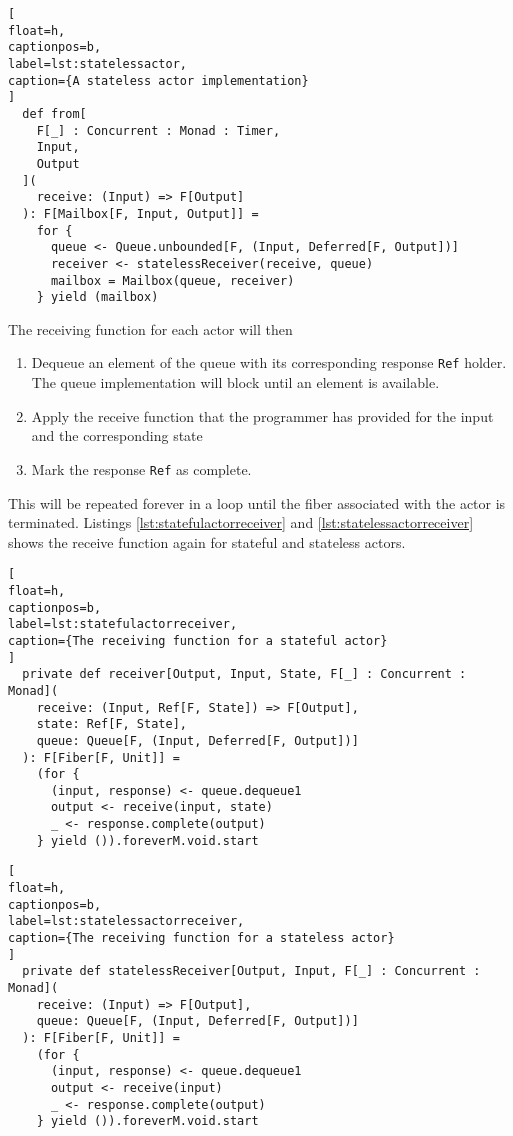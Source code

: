 \documentclass[../main.tex]{subfiles}
\begin{document}
\begin{lstlisting}[
float=h,
captionpos=b,
label=lst:statelessactor,
caption={A stateless actor implementation}
]
  def from[
    F[_] : Concurrent : Monad : Timer,
    Input,
    Output
  ](
    receive: (Input) => F[Output]
  ): F[Mailbox[F, Input, Output]] =
    for {
      queue <- Queue.unbounded[F, (Input, Deferred[F, Output])]
      receiver <- statelessReceiver(receive, queue)
      mailbox = Mailbox(queue, receiver)
    } yield (mailbox)
\end{lstlisting}

The receiving function for each actor will then

\begin{enumerate}
\item Dequeue an element of the queue with its corresponding response
  \texttt{Ref} holder. The queue implementation will block until an element is
  available.
\item Apply the receive function that the programmer has provided for the input
  and the corresponding state
\item Mark the response \texttt{Ref} as complete.
\end{enumerate}

This will be repeated forever in a loop until the fiber associated with the
actor is terminated. Listings \ref{lst:statefulactorreceiver} and
\ref{lst:statelessactorreceiver} shows the receive function again for stateful
and stateless actors.

\begin{lstlisting}[
float=h,
captionpos=b,
label=lst:statefulactorreceiver,
caption={The receiving function for a stateful actor}
]
  private def receiver[Output, Input, State, F[_] : Concurrent : Monad](
    receive: (Input, Ref[F, State]) => F[Output],
    state: Ref[F, State],
    queue: Queue[F, (Input, Deferred[F, Output])]
  ): F[Fiber[F, Unit]] =
    (for {
      (input, response) <- queue.dequeue1
      output <- receive(input, state)
      _ <- response.complete(output)
    } yield ()).foreverM.void.start
\end{lstlisting}

\begin{lstlisting}[
float=h,
captionpos=b,
label=lst:statelessactorreceiver,
caption={The receiving function for a stateless actor}
]
  private def statelessReceiver[Output, Input, F[_] : Concurrent : Monad](
    receive: (Input) => F[Output],
    queue: Queue[F, (Input, Deferred[F, Output])]
  ): F[Fiber[F, Unit]] =
    (for {
      (input, response) <- queue.dequeue1
      output <- receive(input)
      _ <- response.complete(output)
    } yield ()).foreverM.void.start
\end{lstlisting}
\end{document}
